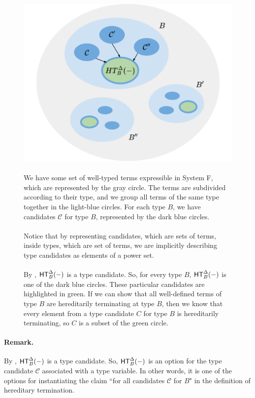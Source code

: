 \documentclass[letterpaper]{article}
\begin{document}
\begin{figure}
    \centering
    \includegraphics[width=4.5in]{intuition.png}
    \caption{\\We have some set of well-typed terms expressible in System F, which are represented by the gray circle. The terms are subdivided according to their type, and we group all terms of the same type together in the light-blue circles. For each type $B$, we have candidates $\mathcal{C}$ for type $B$, represented by the dark blue circles. \\ \\ Notice that by representing candidates, which are sets of terms, inside types, which are set of terms, we are implicitly describing type candidates as elements of a power set. \\ \\ By , $\HT[B]^{\Delta}(-)$ is a type candidate. So, for every type $B$, $\HT[B]^{\Delta}(-)$ is one of the dark blue circles. These particular candidates are highlighted in green. If we can show that all well-defined terms of type $B$ are hereditarily terminating at type $B$, then we know that every element from a type candidate $C$ for type $B$ is hereditarily terminating, so $C$ is a subset of the green circle.}
    \label{fig:intuition}
\end{figure}


\paragraph{Remark.} By , $\HT[B]^{\Delta}(-)$ is a type candidate. So, $\HT[B]^{\Delta}(-)$ is an option for the type candidate $\mathcal{C}$ associated with a type variable. In other words, it is one of the options for instantiating the claim ``for all candidates $\mathcal{C}$ for $B$" in the definition of hereditary termination.
\end{document}

